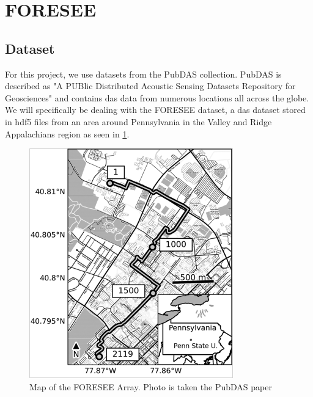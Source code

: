 \section{FORESEE}

\subsection{Dataset}

For this project, we use datasets from the PubDAS \cite{spica2023pubdas} collection. PubDAS is described as "A PUBlic Distributed Acoustic Sensing Datasets Repository for Geosciences" and contains \acrshort{das} data from numerous locations all across the globe. We will specifically be dealing with the FORESEE dataset, a \acrshort{das} dataset stored in \acrshort{hdf5} files from an area around Pennsylvania in the Valley and Ridge Appalachians region as seen in \ref{fig:foresee}. \\

\begin{figure}[!h]
    \centering
    \includegraphics[width=0.5\linewidth]{figures/foresee.png}
    \caption{Map of the FORESEE Array. Photo is taken the PubDAS paper \cite{spica2023pubdas}}
    \label{fig:foresee}
\end{figure}

